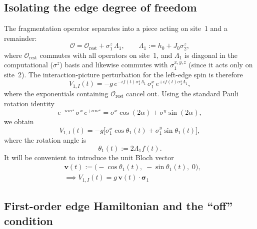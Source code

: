 \documentclass[aps,prb,reprint,twocolumn,amsmath,amssymb,citeautoscript]{revtex4-2}
\begin{document}
\subsection{Isolating the edge degree of freedom}
\label{app:edge:setup}

The fragmentation operator separates into a piece acting on site~1
and a remainder:
\begin{equation}
\mathcal{O}=\mathcal{O}_{\mathrm{rest}}+\sigma_1^z\,\Lambda_1,
\qquad
\Lambda_1:=h_0+J_0\sigma_2^z,
\label{eq:app:edge_Lambda}
\end{equation}
where $\mathcal{O}_{\mathrm{rest}}$ commutes with all operators on
site~1, and $\Lambda_1$ is diagonal in the computational
($\sigma^z$) basis and likewise commutes with $\sigma_1^{x,y,z}$
(since it acts only on site~2).
The interaction-picture perturbation for the left-edge spin is
therefore
\begin{equation}
V_{1,I}(t)
=-g\,e^{-if(t)\sigma_1^z\Lambda_1}\,\sigma_1^x\,
e^{+if(t)\sigma_1^z\Lambda_1},
\label{eq:app:edge_V1I}
\end{equation}
where the exponentials containing $\mathcal{O}_{\mathrm{rest}}$ cancel out.
Using the standard Pauli rotation identity
\begin{equation}
e^{-i\alpha\sigma^z}\,\sigma^x\,e^{+i\alpha\sigma^z}
=\sigma^x\cos(2\alpha)+\sigma^y\sin(2\alpha),
\label{eq:app:Pauli_rotation}
\end{equation}
we obtain
\begin{equation}
V_{1,I}(t)
=-g\bigl[\sigma_1^x\cos\theta_1(t)
+\sigma_1^y\sin\theta_1(t)\bigr],
\label{eq:app:edge_VIcompact}
\end{equation}
where the rotation angle is
\begin{equation}
\theta_1(t):=2\Lambda_1 f(t).
\label{eq:app:edge_theta}
\end{equation}
It will be convenient to introduce the unit Bloch vector
\begin{align}
&\mathbf{v}(t)
:=\bigl(-\cos\theta_1(t),\;-\sin\theta_1(t),\;0\bigr),
\label{eq:app:edge_vvec}\\
&\implies V_{1,I}(t)=g\,\mathbf{v}(t)\cdot\boldsymbol{\sigma}_1 \label{eq:V_1I}
\end{align}

\subsection{First-order edge Hamiltonian and the ``off'' condition}
\label{app:edge:first_order}
\end{document}
